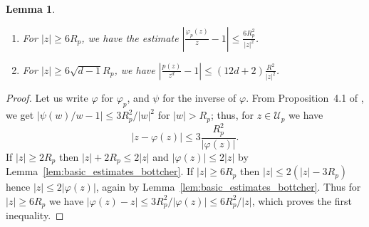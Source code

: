 \documentclass[oneside, 12pt]{amsart}
\newcommand{\abs}[1]{\left\vert#1\right\vert}
\theoremstyle{plain}
\newtheorem{lem}[thm]{Lemma}
\theoremstyle{definition}
\numberwithin{equation}{section}       %
\numberwithin{equation}{section}       %
\begin{document}
\begin{lem}\label{lem:basic_estimate_on_p/zd}~ 
\begin{enumerate}[\rm (1)]
\item For $\abs{z}\geq 6R_p$, we have the estimate 
$\displaystyle \abs{\frac{\varphi_p(z)}{z}-1}\leq \frac{6R_p^2}{{\abs{z}^2}}$. 
\item  For $\abs{z}\geq 6\sqrt{d-1} R_p$,  we have  
$\displaystyle
\abs{ \frac{p(z)}{z^d} -1 } \leq (12d+2)\frac{R^2}{\abs{z}^2}$.
\end{enumerate}
\end{lem}
\begin{proof} Let us write $\varphi$  for $\varphi_p$, and 
$\psi$ for the inverse of $\varphi$.
From Proposition~4.1 of \cite{branner-hubbard1}, we get  $\abs{\psi(w)/w - 1} \leq 3 R_p^2/\abs{w}^2  $ for $\abs{w}>R_p$; thus, for  $z\in \mathcal{U}_p$ we have
\begin{equation} \label{eq:varphip1}
\abs{z-\varphi(z)} \leq 3\frac{R_p^2}{\abs{\varphi(z)}}.
\end{equation} 
If  $\abs{z}\geq 2R_p$ then $\abs{z}+2R_p\leq 2\abs{z}$ and $\abs{\varphi(z)}\leq 2\abs{z}$ by Lemma~\ref{lem:basic_estimates_bottcher}.
If  $\abs{z}\geq 6R_p$
then $\abs{z}\leq 2(\abs{z}-3R_p)$ hence  $\abs{z}\leq 2\abs{\varphi(z)}$, again by Lemma~\ref{lem:basic_estimates_bottcher}. 
Thus for $\abs{z}\geq 6R_p$ we have $\abs{ \varphi(z)-z}\leq 3R_p^2/\abs{\varphi(z)}\leq 6R_p^2/\abs{z}$, which
proves the first inequality.


\end{proof}
\end{document}
